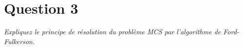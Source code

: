 \section{Question 3}
\textit{Expliquez le principe de résolution du problème MCS par l'algorithme de Ford-Fulkerson.}

